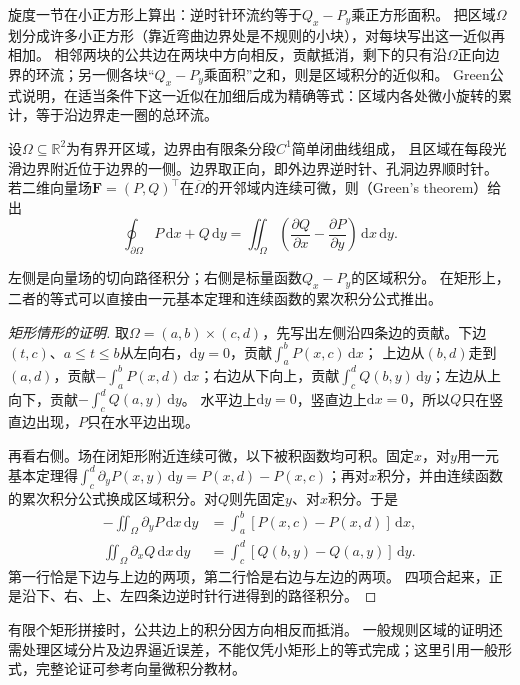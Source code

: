 旋度一节在小正方形上算出：逆时针环流约等于$Q_x-P_y$乘正方形面积。
把区域$\Omega$划分成许多小正方形（靠近弯曲边界处是不规则的小块），对每块写出这一近似再相加。
相邻两块的公共边在两块中方向相反，贡献抵消，剩下的只有沿$\Omega$正向边界的环流；另一侧各块“$Q_x-P_y$乘面积”之和，则是区域积分的近似和。
Green公式说明，在适当条件下这一近似在加细后成为精确等式：区域内各处微小旋转的累计，等于沿边界走一圈的总环流。
\begin{theorem}[Green公式]
\label{thm:multivariable-green}
设$\Omega\subseteq\mathbb R^2$为有界开区域，边界由有限条分段$C^1$简单闭曲线组成，
且区域在每段光滑边界附近位于边界的一侧。边界取正向，即外边界逆时针、孔洞边界顺时针。
若二维向量场$\bm F=(P,Q)^\top$在$\overline\Omega$的开邻域内连续可微，则（Green's theorem）给出
\begin{equation}
 \oint_{\partial\Omega}P\,\mathrm dx+Q\,\mathrm dy
 =\iint_\Omega\left(\frac{\partial Q}{\partial x}-\frac{\partial P}{\partial y}\right)\,\mathrm dx\,\mathrm dy.
 \label{eq:multivariable-green}
\end{equation}
\end{theorem}
左侧是向量场的切向路径积分；右侧是标量函数$Q_x-P_y$的区域积分。
在矩形上，二者的等式可以直接由一元基本定理和连续函数的累次积分公式推出。
\begin{proof}[矩形情形的证明]
取$\Omega=(a,b)\times(c,d)$，先写出左侧沿四条边的贡献。下边$(t,c)$、$a\leq t\leq b$从左向右，$\mathrm dy=0$，贡献$\int_a^bP(x,c)\,\mathrm dx$；
上边从$(b,d)$走到$(a,d)$，贡献$-\int_a^bP(x,d)\,\mathrm dx$；右边从下向上，贡献$\int_c^dQ(b,y)\,\mathrm dy$；左边从上向下，贡献$-\int_c^dQ(a,y)\,\mathrm dy$。
水平边上$\mathrm dy=0$，竖直边上$\mathrm dx=0$，所以$Q$只在竖直边出现，$P$只在水平边出现。

再看右侧。场在闭矩形附近连续可微，以下被积函数均可积。固定$x$，对$y$用一元基本定理得$\int_c^d\partial_yP(x,y)\,\mathrm dy=P(x,d)-P(x,c)$；再对$x$积分，并由连续函数的累次积分公式换成区域积分。对$Q$则先固定$y$、对$x$积分。于是
\[
 \begin{aligned}
 -\iint_\Omega\partial_yP\,\mathrm dx\,\mathrm dy
 &=\int_a^b[P(x,c)-P(x,d)]\,\mathrm dx,\\
 \iint_\Omega\partial_xQ\,\mathrm dx\,\mathrm dy
 &=\int_c^d[Q(b,y)-Q(a,y)]\,\mathrm dy.
 \end{aligned}
\]
第一行恰是下边与上边的两项，第二行恰是右边与左边的两项。
四项合起来，正是沿下、右、上、左四条边逆时针行进得到的路径积分。
\end{proof}
有限个矩形拼接时，公共边上的积分因方向相反而抵消。
一般规则区域的证明还需处理区域分片及边界逼近误差，不能仅凭小矩形上的等式完成；这里引用一般形式，完整论证可参考向量微积分教材。

